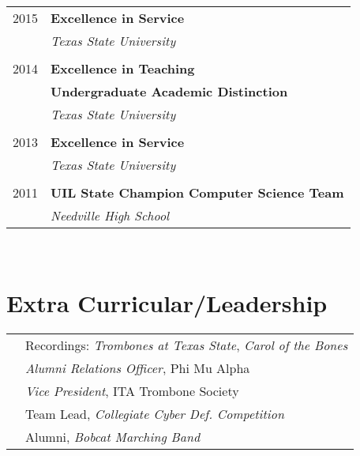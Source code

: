 \documentclass[10pt]{article} %
\begin{document}
\begin{minipage}[t]{0.44\textwidth}
\begin{tabular}{rl}
2015     & \textbf{Excellence in Service}\\
& \textit{Texas State University}\\ \\
2014	 & \textbf{Excellence in Teaching}\\
	 & \textbf{Undergraduate Academic Distinction}\\
& \textit{Texas State University}\\ \\

2013     & \textbf{Excellence in Service}\\
& \textit{Texas State University}\\ \\


2011	 & \textbf{UIL State Champion Computer Science Team}\\
& \textit{Needville High School}
\end{tabular}\\[10pt]



\section{Extra Curricular/Leadership} 

\begin{tabular}{rl}
& Recordings: \textit{Trombones at Texas State}, \textit{Carol of the Bones} \\
& \textit{Alumni Relations Officer}, Phi Mu Alpha \\
& \textit{Vice President}, ITA Trombone Society\\
& Team Lead, \textit{Collegiate Cyber Def. Competition}\\
& Alumni, \textit{Bobcat Marching Band}\\
\end{tabular}\\[10pt]

	
\end{minipage} %
\end{document}
